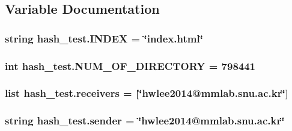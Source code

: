 \subsection{Variable Documentation}
\hypertarget{namespacehash__test_afaac1ce28cb726db1ae789e191ff39e6}{
\subsubsection[{I\-N\-D\-E\-X}]{\setlength{\rightskip}{0pt plus 5cm}string hash\-\_\-test.\-I\-N\-D\-E\-X = \char`\"{}index.\-html\char`\"{}}}\label{namespacehash__test_afaac1ce28cb726db1ae789e191ff39e6}
\hypertarget{namespacehash__test_a81ba1c79694b5fe8a0626d8369dbe7e8}{
\subsubsection[{N\-U\-M\-\_\-\-O\-F\-\_\-\-D\-I\-R\-E\-C\-T\-O\-R\-Y}]{\setlength{\rightskip}{0pt plus 5cm}int hash\-\_\-test.\-N\-U\-M\-\_\-\-O\-F\-\_\-\-D\-I\-R\-E\-C\-T\-O\-R\-Y = 798441}}\label{namespacehash__test_a81ba1c79694b5fe8a0626d8369dbe7e8}
\hypertarget{namespacehash__test_ae898e0fc89510f5d09236d516ee04537}{
\subsubsection[{receivers}]{\setlength{\rightskip}{0pt plus 5cm}list hash\-\_\-test.\-receivers = \mbox{[}\char`\"{}hwlee2014@mmlab.\-snu.\-ac.\-kr\char`\"{}\mbox{]}}}\label{namespacehash__test_ae898e0fc89510f5d09236d516ee04537}
\hypertarget{namespacehash__test_a44b81fcb8e8f8c20e8041b98b4ddb600}{
\subsubsection[{sender}]{\setlength{\rightskip}{0pt plus 5cm}string hash\-\_\-test.\-sender = \char`\"{}hwlee2014@mmlab.\-snu.\-ac.\-kr\char`\"{}}}\label{namespacehash__test_a44b81fcb8e8f8c20e8041b98b4ddb600}

